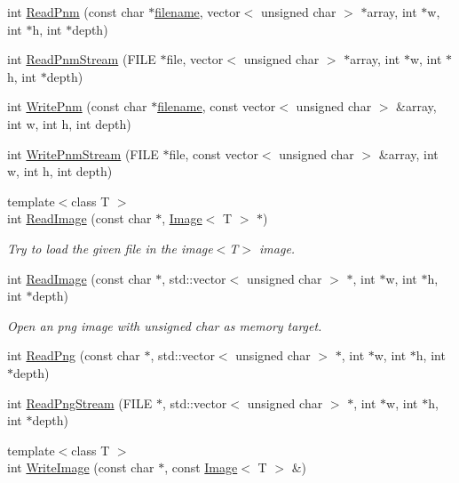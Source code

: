 \begin{DoxyCompactItemize}
\item 
int \hyperlink{namespacelibs_a1c80ecbaf84e21c204664a539cd96f92}{Read\+Pnm} (const char $\ast$\hyperlink{cdjpeg_8h_a47b60f696fdf746577cdf42ed791c264}{filename}, vector$<$ unsigned char $>$ $\ast$array, int $\ast$w, int $\ast$h, int $\ast$depth)
\item 
int \hyperlink{namespacelibs_ab921438155ebe348b31d5cb46490a343}{Read\+Pnm\+Stream} (F\+I\+L\+E $\ast$file, vector$<$ unsigned char $>$ $\ast$array, int $\ast$w, int $\ast$h, int $\ast$depth)
\item 
int \hyperlink{namespacelibs_a35c75283787ee9dd136cf9121a45bafd}{Write\+Pnm} (const char $\ast$\hyperlink{cdjpeg_8h_a47b60f696fdf746577cdf42ed791c264}{filename}, const vector$<$ unsigned char $>$ \&array, int w, int h, int depth)
\item 
int \hyperlink{namespacelibs_a11a9140d37cc5169fa8892657e31a941}{Write\+Pnm\+Stream} (F\+I\+L\+E $\ast$file, const vector$<$ unsigned char $>$ \&array, int w, int h, int depth)
\item 
{\footnotesize template$<$class T $>$ }\\int \hyperlink{namespacelibs_a07baf752525291b560e9036e9905ce10}{Read\+Image} (const char $\ast$, \hyperlink{classImage}{Image}$<$ T $>$ $\ast$)
\begin{DoxyCompactList}\small\item\em Try to load the given file in the image$<$\+T$>$ image. \end{DoxyCompactList}\item 
int \hyperlink{namespacelibs_a7d9169f2d4916c38c0166586cf939755}{Read\+Image} (const char $\ast$, std\+::vector$<$ unsigned char $>$ $\ast$, int $\ast$w, int $\ast$h, int $\ast$depth)
\begin{DoxyCompactList}\small\item\em Open an png image with unsigned char as memory target. \end{DoxyCompactList}\item 
int \hyperlink{namespacelibs_ad2f60d0c6ebf3a56362b55a21babf489}{Read\+Png} (const char $\ast$, std\+::vector$<$ unsigned char $>$ $\ast$, int $\ast$w, int $\ast$h, int $\ast$depth)
\item 
int \hyperlink{namespacelibs_ace195af6d81306f7dd5e1374e52fac2d}{Read\+Png\+Stream} (F\+I\+L\+E $\ast$, std\+::vector$<$ unsigned char $>$ $\ast$, int $\ast$w, int $\ast$h, int $\ast$depth)
\item 
{\footnotesize template$<$class T $>$ }\\int \hyperlink{namespacelibs_a299078d410d26bb41a2e22c13f1ae40d}{Write\+Image} (const char $\ast$, const \hyperlink{classImage}{Image}$<$ T $>$ \&)

\end{DoxyCompactItemize}
